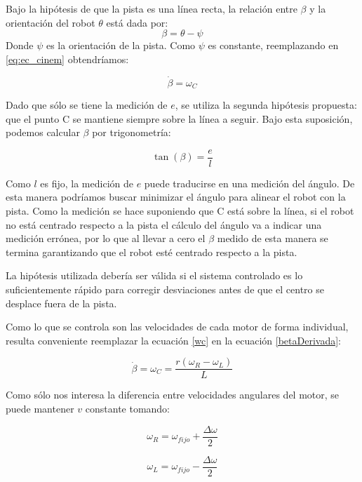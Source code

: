 \documentclass[10pt,conference,a4paper,onecolumn]{article}%
\begin{document}
Bajo la hipótesis de que la pista es una línea recta, la relación entre $\beta$ y la orientación del robot $\theta$ está dada por: \begin{equation*}
\beta=\theta-\psi
\end{equation*}
Donde $\psi$ es la orientación de la pista. Como $\psi$ es constante, reemplazando en \ref{eq:ec_cinem} obtendríamos:

\begin{equation}
\label{betaDerivada}
\dot{\beta}=\omega_C
\end{equation}

Dado que sólo se tiene la medición de $e$, se utiliza la segunda hipótesis propuesta: que el punto C se mantiene siempre sobre la línea a seguir. Bajo esta suposición, podemos calcular $\beta $ por trigonometría:

\begin{equation*}
\tan(\beta)=\frac{e}{l}
\end{equation*}

Como $l$ es fijo, la medición de $e$ puede traducirse en una medición del ángulo. De esta manera podríamos buscar minimizar el ángulo para alinear el robot con la pista. Como la medición se hace suponiendo que C está sobre la línea, si el robot no está centrado respecto a la pista el cálculo del ángulo va a indicar una medición errónea, por lo que al llevar a cero el $ \beta $ medido de esta manera se termina garantizando que el robot esté centrado respecto a la pista.

La hipótesis utilizada debería ser válida si el sistema controlado es lo suficientemente rápido para corregir desviaciones antes de que el centro se desplace fuera de la pista.

Como lo que se controla son las velocidades de cada motor de forma individual, resulta conveniente reemplazar  la ecuación \ref{wc} en la ecuación \ref{betaDerivada}:

\begin{equation*}
\dot{\beta}=\omega_C=\frac{r(\omega _R - \omega _L)}{L}
\end{equation*}

Como sólo nos interesa la diferencia entre velocidades angulares del motor, se puede mantener $v$ constante tomando:

\begin{equation*}
\omega _R = \omega _{fijo} + \frac{\Delta \omega}{2} 
\end{equation*}

\begin{equation*}
\omega _L = \omega _{fijo} -\frac{\Delta \omega}{2}
\end{equation*}
\end{document}
